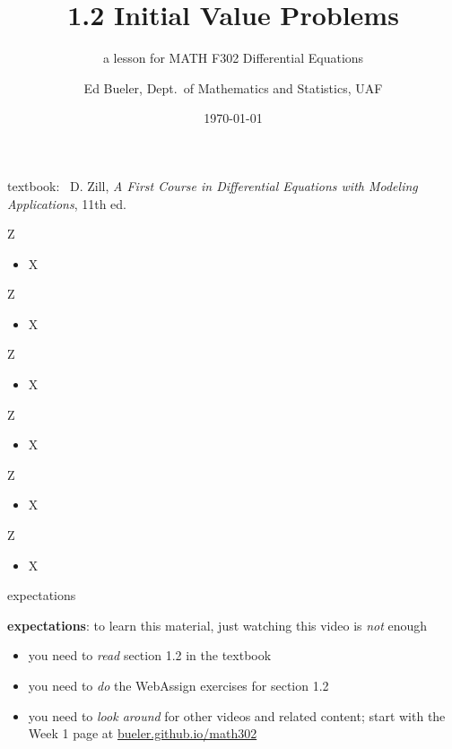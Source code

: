 \documentclass{beamer}
\title{1.2 Initial Value Problems}
\subtitle{a lesson for MATH F302 Differential Equations}
\date{\today}
\author{Ed Bueler, Dept.~of Mathematics and Statistics, UAF}
\begin{document}


\begin{frame}
\titlepage

\centerline{\tiny textbook: \, D. Zill, \emph{A First Course in Differential Equations with Modeling Applications}, 11th ed.}
\end{frame}

\begin{frame}{Z}

\begin{itemize}
\item X
\end{itemize}
\end{frame}

\begin{frame}{Z}

\begin{itemize}
\item X
\end{itemize}
\end{frame}

\begin{frame}{Z}

\begin{itemize}
\item X
\end{itemize}
\end{frame}

\begin{frame}{Z}

\begin{itemize}
\item X
\end{itemize}
\end{frame}

\begin{frame}{Z}

\begin{itemize}
\item X
\end{itemize}
\end{frame}

\begin{frame}{Z}

\begin{itemize}
\item X
\end{itemize}
\end{frame}



\begin{frame}{expectations}

\textbf{expectations}:  to learn this material, just watching this video is \emph{not} enough
\begin{itemize}
\item you need to \emph{read} section 1.2 in the textbook
\item you need to \emph{do} the WebAssign exercises for section 1.2
\item you need to \emph{look around} for other videos and related content; start with the Week 1 page at \href{https://bueler.github.io/math302/}{bueler.github.io/math302}
\end{itemize}
\end{frame}
\end{document}
